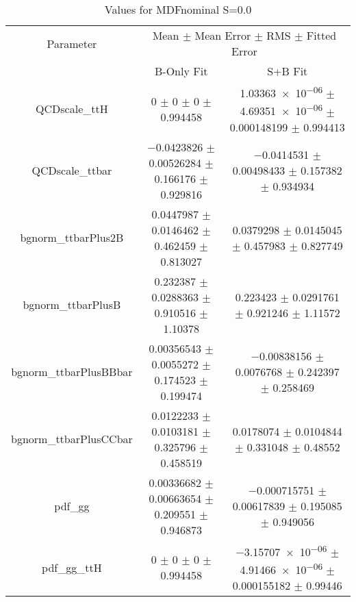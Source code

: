 \begin{table}
\centering
\caption{Values for MDFnominal S=0.0}
\begin{tabular}{ccc}
\toprule
Parameter & \multicolumn{2}{c}{Mean $\pm$ Mean Error $\pm$ RMS $\pm$ Fitted Error}\\
 & B-Only Fit & S+B Fit\\
\midrule
QCDscale\_ttH & \num{0} $\pm$ \num{0} $\pm$ \num{0} $\pm$ \num{0.994458} & \num{1.03363e-06} $\pm$ \num{4.69351e-06} $\pm$ \num{0.000148199} $\pm$ \num{0.994413}\\
QCDscale\_ttbar & \num{-0.0423826} $\pm$ \num{0.00526284} $\pm$ \num{0.166176} $\pm$ \num{0.929816} & \num{-0.0414531} $\pm$ \num{0.00498433} $\pm$ \num{0.157382} $\pm$ \num{0.934934}\\
bgnorm\_ttbarPlus2B & \num{0.0447987} $\pm$ \num{0.0146462} $\pm$ \num{0.462459} $\pm$ \num{0.813027} & \num{0.0379298} $\pm$ \num{0.0145045} $\pm$ \num{0.457983} $\pm$ \num{0.827749}\\
bgnorm\_ttbarPlusB & \num{0.232387} $\pm$ \num{0.0288363} $\pm$ \num{0.910516} $\pm$ \num{1.10378} & \num{0.223423} $\pm$ \num{0.0291761} $\pm$ \num{0.921246} $\pm$ \num{1.11572}\\
bgnorm\_ttbarPlusBBbar & \num{0.00356543} $\pm$ \num{0.0055272} $\pm$ \num{0.174523} $\pm$ \num{0.199474} & \num{-0.00838156} $\pm$ \num{0.0076768} $\pm$ \num{0.242397} $\pm$ \num{0.258469}\\
bgnorm\_ttbarPlusCCbar & \num{0.0122233} $\pm$ \num{0.0103181} $\pm$ \num{0.325796} $\pm$ \num{0.458519} & \num{0.0178074} $\pm$ \num{0.0104844} $\pm$ \num{0.331048} $\pm$ \num{0.48552}\\
pdf\_gg & \num{0.00336682} $\pm$ \num{0.00663654} $\pm$ \num{0.209551} $\pm$ \num{0.946873} & \num{-0.000715751} $\pm$ \num{0.00617839} $\pm$ \num{0.195085} $\pm$ \num{0.949056}\\
pdf\_gg\_ttH & \num{0} $\pm$ \num{0} $\pm$ \num{0} $\pm$ \num{0.994458} & \num{-3.15707e-06} $\pm$ \num{4.91466e-06} $\pm$ \num{0.000155182} $\pm$ \num{0.99446}\\
\bottomrule
\end{tabular}
\end{table}